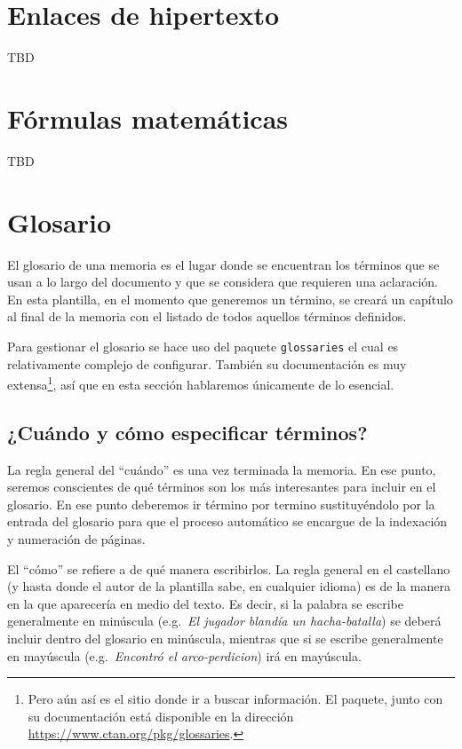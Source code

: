 \documentclass[%
    school=etsisi,%
    degree=61TI,%
]{upm-report}
\begin{document}
\section{Enlaces de hipertexto}

TBD

\section{Fórmulas matemáticas}

TBD

\section{Glosario}
\label{s:glosario}

El glosario de una memoria es el lugar donde se encuentran los términos que se usan a lo largo del documento y que se considera que requieren una aclaración. En esta plantilla, en el momento que generemos un término, se creará un capítulo al final de la memoria con el listado de todos aquellos términos definidos.

Para gestionar el glosario se hace uso del paquete \texttt{glossaries} el cual es relativamente complejo de configurar. También su documentación es muy extensa\footnote{Pero aún así es el sitio donde ir a buscar información. El paquete, junto con su documentación está disponible en la dirección \href{https://www.ctan.org/pkg/glossaries}{https://www.ctan.org/pkg/glossaries}.}, así que en esta sección hablaremos únicamente de lo esencial.

\subsection{¿Cuándo y cómo especificar términos?}

La regla general del \enquote{cuándo} es una vez terminada la memoria. En ese punto, seremos conscientes de qué términos son los más interesantes para incluir en el glosario. En ese punto deberemos ir término por termino sustituyéndolo por la entrada del glosario para que el proceso automático se encargue de la indexación y numeración de páginas.

El \enquote{cómo} se refiere a de qué manera escribirlos. La regla general en el castellano (y hasta donde el autor de la plantilla sabe, en cualquier idioma) es de la manera en la que aparecería en medio del texto. Es decir, si la palabra se escribe generalmente en minúscula (e.g.~\textit{El jugador blandía un \gls{hacha-batalla}}) se deberá incluir dentro del glosario en minúscula, mientras que si se escribe generalmente en mayúscula (e.g.~\textit{Encontró el \gls{arco-perdicion}}) irá en mayúscula.
\end{document}
